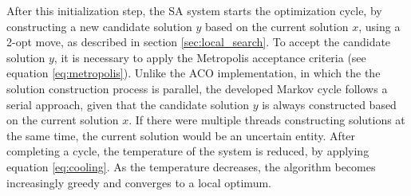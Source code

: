 
After this initialization step, the SA system starts the optimization cycle, by constructing a new candidate solution $y$ based on the current solution $x$, using a 2-opt move, as described in section \ref{sec:local_search}.
To accept the candidate solution $y$, it is necessary to apply the Metropolis acceptance criteria (see equation \ref{eq:metropolis}).
Unlike the ACO implementation, in which the the solution construction process is parallel, the developed Markov cycle follows a serial approach, given that the candidate solution $y$ is always constructed based on the current solution $x$. If there were multiple threads constructing solutions at the same time, the current solution would be an uncertain entity.
After completing a cycle, the temperature of the system is reduced, by applying equation \ref{eq:cooling}. As the temperature decreases, the algorithm becomes increasingly greedy and converges to a local optimum.



